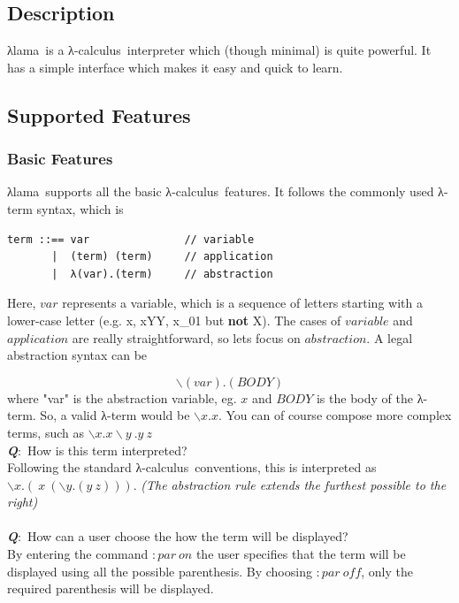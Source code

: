 \documentclass[a4paper]{article}
\newcommand{\lc}{\textgreek{λ}-calculus\ }
\newcommand{\la}{\textgreek{λ}}
\newcommand{\intr}{\textgreek{λ}lama\ }
\begin{document}
\subsection{Description}
\intr is a \lc interpreter which (though minimal) is quite powerful. It has a simple interface which makes it easy and quick to learn. 


\subsection{Supported Features}
\subsubsection{Basic Features}
\intr supports all the basic \lc features. It follows the commonly used \la-term syntax, which is
\\
\begin{lstlisting}
term ::== var               // variable
       |  (term) (term)     // application
       |  λ(var).(term)     // abstraction
\end{lstlisting}


\par Here, $var$ represents a variable, which is a sequence of letters 
starting with a lower-case letter (e.g. x, xYY, x\_01 but \textbf{not} X). The cases of $variable$ and $application$ are really straightforward, so lets focus on $abstraction$. A legal abstraction syntax can be

%
\begin{displaymath}
\backslash(var) . (BODY)
\end{displaymath}
%
where "var" is the abstraction variable, eg. $x$ and $BODY$ is the body of the \la-term. So, a valid \la-term would be $\backslash x . x$. You can of course compose more complex terms, such as $\backslash x. x \backslash y\ .y\ z$ \\ 

\noindent \textbf{\textit{Q}}:\ How is this term interpreted? \\ 
Following the standard \lc conventions, this is interpreted as $\backslash x.(\ x\ (\backslash y.(y\ z)))$. \textit{(The abstraction rule extends the furthest possible to the right)}
~\\ \\
\noindent \textbf{\textit{Q}}:\ How can a user choose the how the term will be displayed? \\ 
By entering the command $:par\ on$ the user specifies that the term will be displayed using all the possible parenthesis. By choosing $:par\ off$, only the required parenthesis will be displayed.
\end{document}
